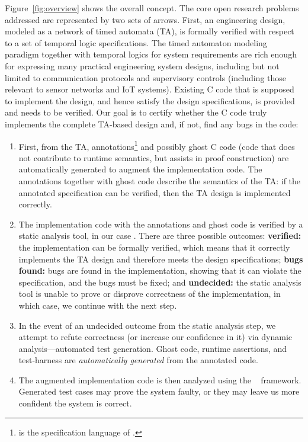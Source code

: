 Figure~\ref{fig:overview} shows the overall concept.  The core
open research problems addressed are represented by two sets of
arrows.  First, an engineering design, modeled as a network of timed
automata (TA), is formally verified with respect to a set of temporal logic specifications.
The timed automaton modeling paradigm together with temporal logics
for system requirements are rich enough for expressing many practical
engineering system designs, including but not limited to communication
protocols and supervisory controls (including those relevant to sensor
networks and IoT systems).  Existing C code that is supposed to
implement the design, and hence satisfy the design specifications, is provided and needs to be verified.
Our goal is to certify whether the C code truly implements the complete TA-based design and, if not, find any bugs in the code:
\begin{enumerate}
\item First, from the TA, \acsl annotations\footnote{\acsl is the
    specification language of \framac{}.} and possibly ghost C code
  (code that does not contribute to runtime semantics, but assists in
  proof construction) are automatically generated to augment the
  implementation code. The annotations together with ghost code
  describe the semantics of the TA: if
  the annotated specification can be verified, then the TA design is implemented correctly.
\item The implementation code with the \acsl annotations and ghost code
  is verified by a static analysis tool, in our case \framac.
  There are three possible outcomes:
  {\bf verified:} the implementation can be formally verified, which means that it correctly implements the TA design and therefore meets the design specifications;
  {\bf bugs found:} bugs are found in the implementation, showing that
    it can violate the specification, and the bugs must be fixed; and
  {\bf undecided:} the static analysis tool is unable to prove or disprove correctness of the implementation,
  in which case, we continue with the next step.
\item In the event of an undecided outcome from the static analysis
  step, we attempt to refute correctness (or increase our confidence
  in it) via dynamic analysis---automated test generation.
  Ghost code, runtime assertions, and test-harness are \emph{automatically generated} from the
  annotated code.
\item The augmented implementation code is then analyzed using the
  \deepstate~\cite{DeepState} framework.  Generated test cases may
  prove the system faulty, or they may leave us more confident
  the system is correct.
\end{enumerate}

